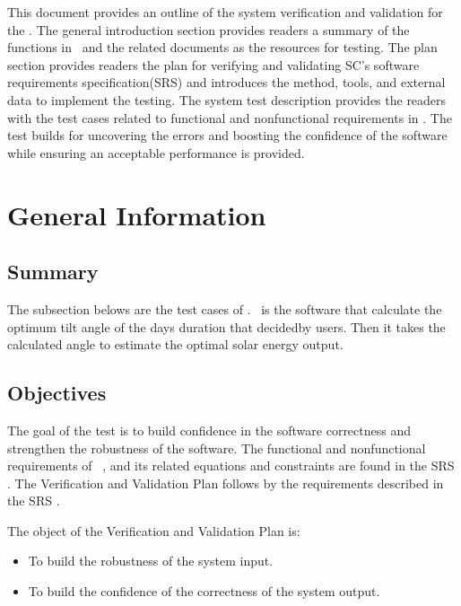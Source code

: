 \documentclass[12pt, titlepage]{article}
\begin{document}

\newpage


This document provides an outline of the system verification and validation for
the \progname. The general introduction section provides readers a summary of
the functions in \progname ~and the related documents as the resources for
testing. The plan section provides readers the plan for verifying and
validating SC's software requirements specification(SRS) and introduces the
method, tools, and external data to implement the testing. The system test
description
provides the readers with the test cases related to functional and nonfunctional
requirements in \progname. The test builds for uncovering the errors and
boosting the confidence of the software while ensuring an acceptable
performance is provided. 



\section{General Information}
\subsection{Summary}

The subsection belows are the test cases of \progname. \progname ~is the
software that calculate the optimum tilt angle of the days duration that
decidedby users. Then it takes the calculated angle to estimate the optimal
solar energy output.


\subsection{Objectives}\label{Objectives}
The goal of the test is to build confidence in the software correctness and
strengthen the robustness of the software. The functional and nonfunctional
requirements of \progname~, and its related equations and constraints are 
found in the SRS \cite{YS2019}. The Verification and Validation Plan follows
by the requirements described in the SRS \cite{YS2019}.

The object of the Verification and Validation Plan is:
\noindent \begin{itemize}

\item[ ] To build the robustness of the system input.
\item[ ] To build the confidence of the correctness of the system output.

\noindent \end{itemize}
\end{document}
